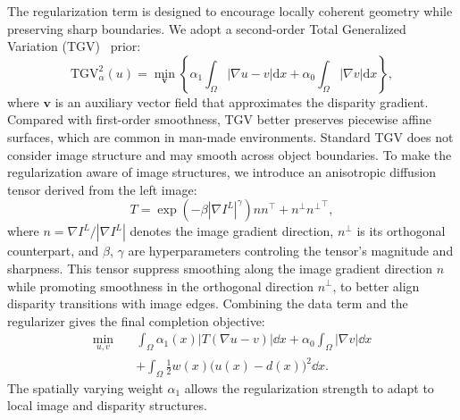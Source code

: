The regularization term is designed to encourage locally coherent geometry while preserving sharp boundaries.
We adopt a second-order Total Generalized Variation (TGV)~\cite{bredies2010total} prior:
\begin{equation}
	\mathrm{TGV}_{\alpha}^{2}(u)
	=
	\min_{\mathbf{v}}
	\left\{
	\alpha_1
	\int_{\Omega}
	|\nabla u-v| \mathrm{d}x
	+
	\alpha_0
	\int_{\Omega}
	|\nabla v| \mathrm{d}x
	\right\},
	\label{eq:sadc-tgv}
\end{equation}
where $\mathbf{v}$ is an auxiliary vector field that approximates the disparity gradient.
Compared with first-order smoothness, TGV better preserves piecewise affine surfaces, which are common in man-made environments.
Standard TGV does not consider image structure and may smooth across object boundaries.
To make the regularization aware of image structures, we introduce an anisotropic diffusion tensor derived from the left image:
\begin{equation}
	T
	=
	\exp
	\left(
	-\beta |\nabla I^L|^{\gamma}
	\right)
	nn^{\top}
	+
	n^{\perp}{n^{\perp}}^{\top},
	\label{eq:sadc-tensor}
\end{equation}
where $n=\nabla I^L/|\nabla I^L|$ denotes the image gradient direction, $n^{\perp}$ is its orthogonal counterpart, and $\beta$, $\gamma$ are hyperparameters controling the tensor's magnitude and sharpness.
This tensor suppress smoothing along the image gradient direction $n$ while promoting smoothness in the orthogonal direction $n^{\perp}$, to better align disparity transitions with image edges.
Combining the data term and the regularizer gives the final completion objective:
\begin{equation}
	\begin{aligned}
		\min_{u,v}
		\quad
		&
		\int_{\Omega} \alpha_1(x)
		|T(\nabla u-v)| \dd x
		+
		\alpha_0
		\int_{\Omega}
		|\nabla v| \dd x
		\\
		&
		+
		\int_{\Omega}
		\frac{1}{2}w(x)
		\bigl(u(x)-d(x)\bigr)^2 \dd x .
	\end{aligned}
	\label{eq:sadc-final-energy}
\end{equation}
The spatially varying weight $\alpha_1$ allows the regularization strength to adapt to local image and disparity structures.

